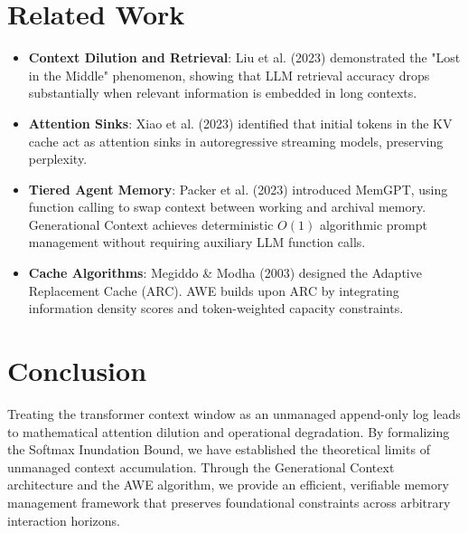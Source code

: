 \documentclass[11pt,a4paper]{article}
\begin{document}
\section{Related Work}
\label{sec:related_work}
\begin{itemize}
    \item \textbf{Context Dilution and Retrieval}: Liu et al. (2023) demonstrated the "Lost in the Middle" phenomenon, showing that LLM retrieval accuracy drops substantially when relevant information is embedded in long contexts.
    \item \textbf{Attention Sinks}: Xiao et al. (2023) identified that initial tokens in the KV cache act as attention sinks in autoregressive streaming models, preserving perplexity.
    \item \textbf{Tiered Agent Memory}: Packer et al. (2023) introduced MemGPT, using function calling to swap context between working and archival memory. Generational Context achieves deterministic $O(1)$ algorithmic prompt management without requiring auxiliary LLM function calls.
    \item \textbf{Cache Algorithms}: Megiddo \& Modha (2003) designed the Adaptive Replacement Cache (ARC). AWE builds upon ARC by integrating information density scores and token-weighted capacity constraints.
\end{itemize}

\section{Conclusion}
\label{sec:conclusion}
Treating the transformer context window as an unmanaged append-only log leads to mathematical attention dilution and operational degradation. By formalizing the Softmax Inundation Bound, we have established the theoretical limits of unmanaged context accumulation. Through the Generational Context architecture and the AWE algorithm, we provide an efficient, verifiable memory management framework that preserves foundational constraints across arbitrary interaction horizons.
\end{document}
